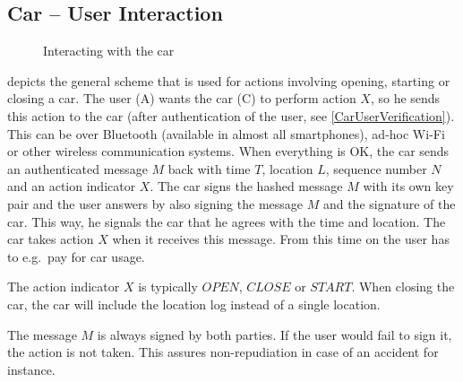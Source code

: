 \subsection{Car -- User Interaction}

\begin{figure}[!ht]
  \renewcommand{\Bx}{8}
  \setcounter{CC}{0}
  \centering
  \caption{Interacting with the car}
  \label{XCar}
\end{figure}

 depicts the general scheme that is used for actions involving opening, starting or closing a car. The user (A) wants the car (C) to perform action $X$, so he sends this action to the car (after authentication of the user, see \cref{CarUserVerification}). This can be over Bluetooth (available in almost all smartphones), ad-hoc Wi-Fi or other wireless communication systems. When everything is OK, the car sends an authenticated message $M$ back with time $T$, location $L$, sequence number $N$ and an action indicator $X$. The car signs the hashed message $M$ with its own key pair and the user answers by also signing the message $M$ and the signature of the car. This way, he signals the car that he agrees with the time and location. The car takes action $X$ when it receives this message. From this time on the user has to e.g.\ pay for car usage.

The action indicator $X$ is typically $OPEN$, $CLOSE$ or $START$. When closing the car, the car will include the location log instead of a single location.

The message $M$ is always signed by both parties. If the user would fail to sign it, the action is not taken. This assures non-repudiation in case of an accident for instance.


